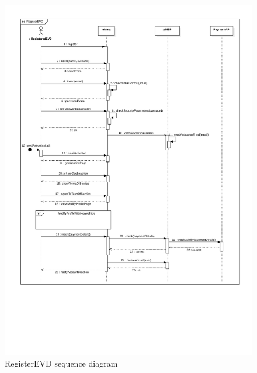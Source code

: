 \begin{figure}[H]
    \centering
    \includegraphics[width=\textwidth, trim={0 0 10cm 0}, clip]{Images/cp3/seqDiagrams/RegisterEVD.pdf}
    \caption{RegisterEVD sequence diagram}
\end{figure}

